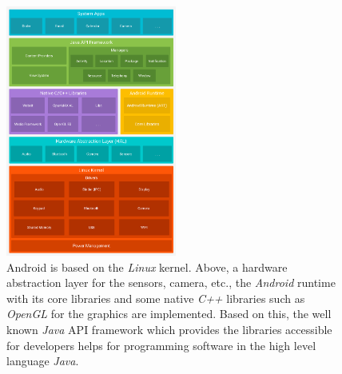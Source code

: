 \begin{figure}[htbp]
	\includegraphics[width=0.5\textwidth]{images/androidstack.png}
	\centering
	\caption[Android stack]{Android is based on the \textit{Linux} kernel. Above, a hardware abstraction layer for the sensors, camera, etc., the \textit{Android} runtime with its core libraries and some native \textit{C++} libraries such as \textit{OpenGL} for the graphics are implemented. Based on this, the well known \textit{Java} API framework which provides the libraries accessible for developers helps for programming software in the high level language \textit{Java}.\footnotemark}
	\label{fig:androidstack}
\end{figure} 

